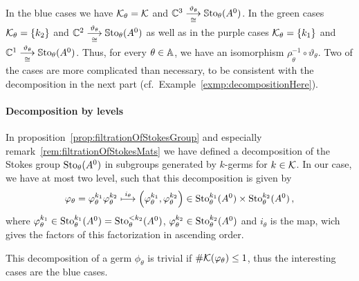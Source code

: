 In the \textcolor{blue!75!black}{blue} cases we have $\mathcal{K}_\theta=\mathcal{K}$ and
$\mathbb{C}^3\overset{\vartheta_\theta}{\underset{\cong}{\longrightarrow}}\operatorname{\mathbb{S}to}_\theta(A^0)$.
In the \textcolor{green!50!black}{green} cases $\mathcal{K}_\theta=\{k_2\}$ and
$\mathbb{C}^2\overset{\vartheta_\theta}{\underset{\cong}{\longrightarrow}}\operatorname{\mathbb{S}to}_\theta(A^0)$ as
well as in the \textcolor{purple!75!black}{purple} cases $\mathcal{K}_\theta=\{k_1\}$
and $\mathbb{C}^1\overset{\vartheta_\theta}{\underset{\cong}{\longrightarrow}}\operatorname{\mathbb{S}to}_\theta(A^0)$.
Thus, for every $\theta\in\mathbb{A}$, we have an isomorphism
$\rho_{\tilde\theta}^{-1}\circ\vartheta_\theta$.
Two of the cases are more complicated than necessary, to be consistent with
the decomposition in the next part (cf.\ Example~\ref{exmp:decompositionHere}).

\paragraph{Decomposition by levels}
In proposition~\ref{prop:filtrationOfStokesGroup} and especially
remark~\ref{rem:filtrationOfStokesMats} we have defined a decomposition of the
Stokes group $\operatorname{Sto}_\theta(A^0)$ in subgroups generated by $k$-germs for
$k\in\mathcal{K}$.
In our case, we have at most two level, such that this decomposition is given
by
\[
  \varphi_\theta=\varphi_\theta^{k_1} \varphi_\theta^{k_2}
  \overset{i_\theta}\longmapsto
    \left(\varphi_\theta^{k_1},\varphi_\theta^{k_2}\right)
      \in\operatorname{Sto}_\theta^{k_1}(A^0)\times\operatorname{Sto}_\theta^{k_2}(A^0) \,,
\]
where $\varphi_\theta^{k_1}\in\operatorname{Sto}_\theta^{k_1}(A^0)=\operatorname{Sto}_\theta^{<k_2}(A^0)$,
$\varphi_\theta^{k_2}\in\operatorname{Sto}_\theta^{k_2}(A^0)$  and $i_\theta$ is the map, wich
gives the factors of this factorization in ascending order.

This decomposition of a germ $\phi_\theta$ is trivial if
$\#\mathcal{K}(\varphi_\theta)\leq1$, thus the interesting cases are the
\textcolor{blue!75!black}{blue} cases.

